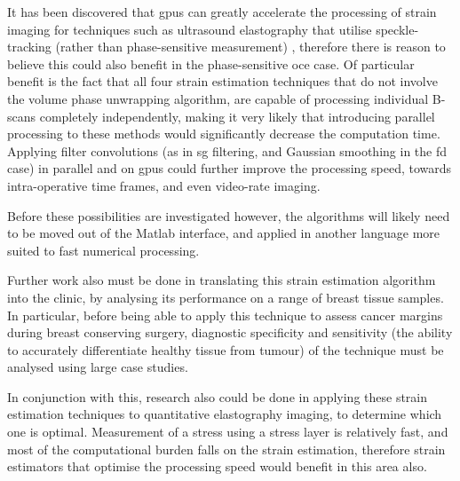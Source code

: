 It has been discovered that \ac{gpu}s can greatly accelerate the processing of strain imaging for techniques such as ultrasound elastography that utilise speckle-tracking (rather than phase-sensitive measurement) \cite{peng_gpu-accelerated_2017}, therefore there is reason to believe this could also benefit in the phase-sensitive \ac{oce} case. Of particular benefit is the fact that all four strain estimation techniques that do not involve the volume phase unwrapping algorithm, are capable of processing individual B-scans completely independently, making it very likely that introducing parallel processing to these methods would significantly decrease the computation time. Applying filter convolutions (as in \ac{sg} filtering, and Gaussian smoothing in the \ac{fd} case) in parallel and on \ac{gpu}s could further improve the processing speed, towards intra-operative time frames, and even video-rate imaging.

Before these possibilities are investigated however, the algorithms will likely need to be moved out of the Matlab interface, and applied in another language more suited to fast numerical processing.

Further work also must be done in translating this strain estimation algorithm into the clinic, by analysing its performance on a range of breast tissue samples. In particular, before being able to apply this technique to assess cancer margins during breast conserving surgery, diagnostic specificity and sensitivity (the ability to accurately differentiate healthy tissue from tumour) of the technique must be analysed using large case studies.

In conjunction with this, research also could be done in applying these strain estimation techniques to quantitative elastography imaging, to determine which one is optimal. Measurement of a stress using a stress layer is relatively fast, and most of the computational burden falls on the strain estimation, therefore strain estimators that optimise the processing speed would benefit in this area also. 

